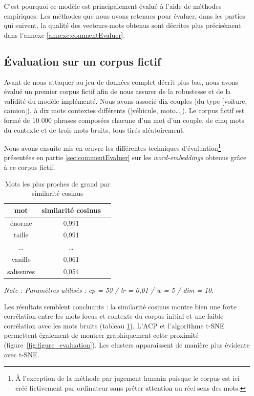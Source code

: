 \documentclass[11pt,french,french]{article}
\let\rmarkdownfootnote\footnote%
\def\footnote{\protect\rmarkdownfootnote}
\begin{document}
C'est pourquoi ce modèle est principalement évalué à l'aide de méthodes
empiriques. Les méthodes que nous avons retenues pour évaluer, dans les
parties qui suivent, la qualité des vecteurs-mots obtenus sont décrites
plus précisément dans l'annexe \ref{annexe:commentEvaluer}.

\subsection{Évaluation sur un corpus fictif}\label{sec:corpusFictif}

Avant de nous attaquer au jeu de données complet décrit plus bas, nous
avons évalué un premier corpus fictif afin de nous assurer de la
robustesse et de la validité du modèle implémenté. Nous avons associé
dix couples (du type {[}voiture, camion{]}), à dix mots contextes
différents ({[}véhicule, moto\dots{]}). Le corpus fictif est formé de 10
000 phrases composées chacune d'un mot d'un couple, de cinq mots du
contexte et de trois mots bruits, tous tirés aléatoirement.

Nous avons ensuite mis en œuvre les différentes techniques
d'évaluation\footnote{À l'exception de la méthode par \og jugement
  humain \fg{} puisque le corpus est ici créé fictivement par ordinateur
  sans prêter attention au réel sens des mots.} présentées en partie
\ref{sec:commentEvaluer} sur les \emph{word-embeddings} obtenus grâce à
ce corpus fictif.

\begin{table}
\begin{center}
\begin{tabular}{|c|c|c|}
    \hline
    mot & similarité cosinus \tabularnewline
    \hline
    énorme & 0,991   \tabularnewline
    taille & 0,991   \tabularnewline
    \dots & \dots    \tabularnewline
    vanille & 0,061   \tabularnewline
    salissures & 0,054   \tabularnewline
    \hline
 \end{tabular}
\captionsetup{margin=0cm,format=hang,justification=justified}
\caption{Mots les plus proches de \og grand \fg{} par similarité cosinus}\label{table:tableau_evaluation}
\end{center}
\vspace{-0.3cm}
\footnotesize
\emph{Note : Paramètres utilisés : ep = 50 / lr = 0,01 / w = 5 / dim = 10.}
\end{table}

Les résultats semblent concluants : la similarité cosinus montre bien
une forte corrélation entre les mots focus et contexte du corpus initial
et une faible corrélation avec les mots bruits (tableau
\ref{table:tableau_evaluation}). L'ACP et l'algorithme t-SNE permettent
également de montrer graphiquement cette proximité
(figure~\ref{fig:figure_evaluation}). Les clusters apparaissent de
manière plus évidente avec t-SNE.
\end{document}
